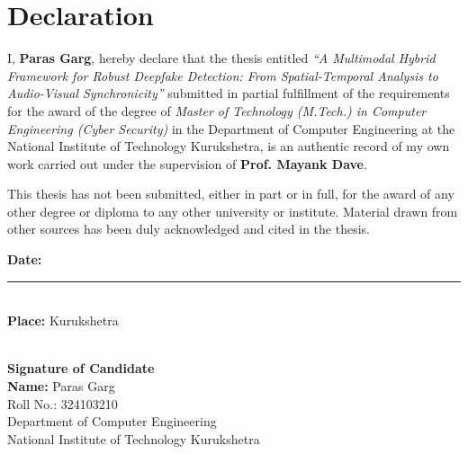 \chapter*{Declaration}
\thispagestyle{plain}

I, \textbf{Paras Garg}, hereby declare that the thesis entitled
\textit{``A Multimodal Hybrid Framework for Robust Deepfake Detection: From Spatial-Temporal Analysis to Audio-Visual Synchronicity''}
submitted in partial fulfillment of the requirements for the award of the degree of \textit{Master of Technology (M.Tech.) in Computer Engineering (Cyber Security)} in the Department of Computer Engineering at the National Institute of Technology Kurukshetra, is an authentic record of my own work carried out under the supervision of \textbf{Prof. Mayank Dave}.

This thesis has not been submitted, either in part or in full, for the award of any other degree or diploma to any other university or institute. Material drawn from other sources has been duly acknowledged and cited in the thesis.

\vspace{1.5cm}
\noindent
\begin{minipage}[t]{0.55\textwidth}
\textbf{Date:} \rule{3.5cm}{0.2pt}\\[0.6cm]
\textbf{Place:} Kurukshetra
\end{minipage}
\hfill
\begin{minipage}[t]{0.4\textwidth}
\makebox[0.9\linewidth]{\hrulefill}\\
\textbf{Signature of Candidate}\\
\textbf{Name:} Paras Garg\\
Roll No.: 324103210\\
Department of Computer Engineering\\
National Institute of Technology Kurukshetra
\end{minipage}